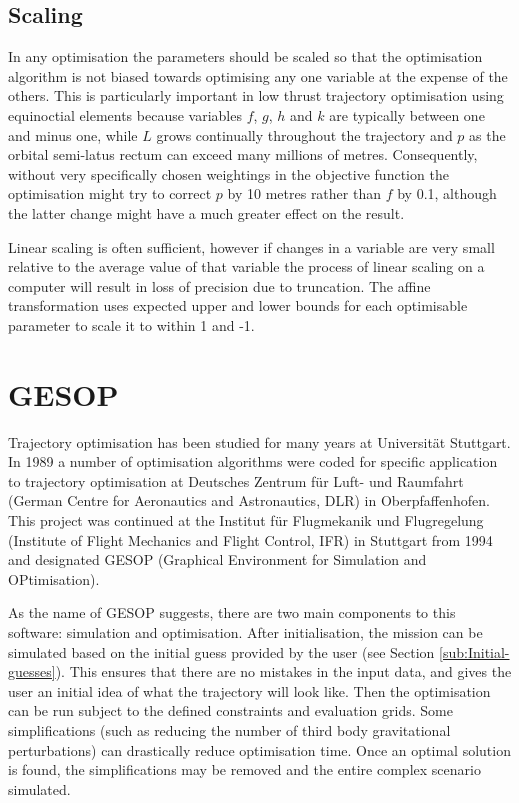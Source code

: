 \subsection{Scaling} \label{sub:Scaling}

In any optimisation the parameters should be scaled so that the optimisation algorithm is not biased towards optimising any one variable at the expense of the others. This is particularly important in low thrust trajectory optimisation using equinoctial elements because variables $f$, $g$, $h$ and $k$ are typically between one and minus one, while $L$ grows continually throughout the trajectory and $p$ as the orbital semi-latus rectum can exceed many millions of metres. Consequently, without very specifically chosen weightings in the objective function the optimisation might try to correct $p$ by 10 metres rather than $f$ by 0.1, although the latter change might have a much greater effect on the result.

Linear scaling is often sufficient, however if changes in a variable are very small relative to the average value of that variable the process of linear scaling on a computer will result in loss of precision due to truncation. The affine transformation \parencite{ASTOS_guide} uses expected upper and lower bounds for each optimisable parameter to scale it to within 1 and -1.

\section{GESOP} \label{sec:GESOP}

Trajectory optimisation has been studied for many years at Universit\"{a}t Stuttgart. In 1989 a number of optimisation algorithms were coded for specific application to trajectory optimisation at Deutsches Zentrum f\"{u}r Luft- und Raumfahrt (German Centre for Aeronautics and Astronautics, DLR) in Oberpfaffenhofen. This project was continued at the Institut f\"{u}r Flugmekanik und Flugregelung (Institute of Flight Mechanics and Flight Control, IFR) in Stuttgart from 1994 and designated GESOP (Graphical Environment for Simulation and OPtimisation).
 
As the name of GESOP suggests, there are two main components to this software: simulation and optimisation. After initialisation, the mission can be simulated based on the initial guess provided by the user (see Section \ref{sub:Initial-guesses}). This ensures that there are no mistakes in the input data, and gives the user an initial idea of what the trajectory will look like. Then the optimisation can be run subject to the defined constraints and evaluation grids. Some simplifications (such as reducing the number of third body gravitational perturbations) can drastically reduce optimisation time. Once an optimal solution is found, the simplifications may be removed and the entire complex scenario simulated.



